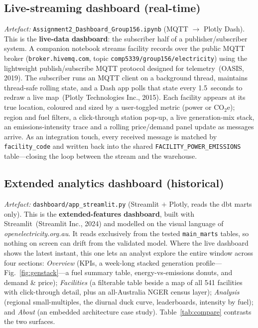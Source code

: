 \documentclass[onecolumn,11pt]{IEEEtran}
\begin{document}
\subsection{Live-streaming dashboard (real-time)}
\emph{Artefact:} \texttt{Assignment2\_Dashboard\_Group156.ipynb} (MQTT
$\rightarrow$ Plotly Dash). This is the \textbf{live-data dashboard}: the
subscriber half of a publisher/subscriber system. A companion notebook streams
facility records over the public MQTT broker
(\texttt{broker.hivemq.com}, topic \texttt{comp5339/group156/electricity}) using
the lightweight publish/subscribe MQTT protocol designed for
telemetry~(OASIS, 2019). The subscriber runs an MQTT client on a background
thread, maintains thread-safe rolling state, and a Dash app polls that state
every 1.5~seconds to redraw a live map~(Plotly Technologies Inc., 2015). Each
facility appears at its true location, coloured and sized by a user-toggled
metric (power or CO$_2$e); region and fuel filters, a click-through station
pop-up, a live generation-mix stack, an emissions-intensity trace and a rolling
price/demand panel update as messages arrive. As an integration touch, every
received message is matched by \texttt{facility\_code} and written back into the
shared \texttt{FACILITY\_POWER\_EMISSIONS} table---closing the loop between the
stream and the warehouse.

\subsection{Extended analytics dashboard (historical)}
\emph{Artefact:} \texttt{dashboard/app\_streamlit.py} (Streamlit $+$ Plotly,
reads the dbt marts only). This is the \textbf{extended-features dashboard},
built with Streamlit~(Streamlit Inc., 2024) and modelled on the visual language
of \textit{openelectricity.org.au}. It reads exclusively from the tested
\texttt{main\_marts} tables, so nothing on screen can drift from the validated
model. Where the live dashboard shows the latest instant, this one lets an
analyst explore the entire window across four sections: \emph{Overview} (KPIs, a
week-long stacked generation profile---Fig.~\ref{fig:genstack}---a fuel summary
table, energy-vs-emissions donuts, and demand \& price); \emph{Facilities} (a
filterable table beside a map of all 541 facilities with click-through detail,
plus an all-Australia NGER census layer); \emph{Analysis} (regional
small-multiples, the diurnal duck curve, leaderboards, intensity by fuel); and
\emph{About} (an embedded architecture case study). Table~\ref{tab:compare}
contrasts the two surfaces.
\end{document}
